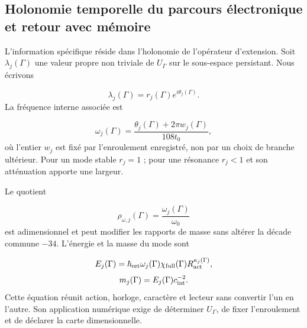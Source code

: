 \subsection{Holonomie temporelle du parcours électronique et retour avec mémoire}
L’information spécifique réside dans l’holonomie de l’opérateur d’extension. Soit \(\lambda_j(\Gamma)\) une valeur propre non triviale de \(U_\Gamma\) sur le sous-espace persistant. Nous écrivons

\[
 \lambda_j(\Gamma)=r_j(\Gamma)e^{i\theta_j(\Gamma)}.
\]
La fréquence interne associée est

\[
 \omega_j(\Gamma)
 =\frac{\theta_j(\Gamma)+2\pi w_j(\Gamma)}{108t_0},
\]
où l’entier \(w_j\) est fixé par l’enroulement enregistré, non par un choix de branche ultérieur. Pour un mode stable \(r_j=1\) ; pour une résonance \(r_j<1\) et son atténuation apporte une largeur.

Le quotient

\[
 \rho_{\omega,j}(\Gamma)
 =\frac{\omega_j(\Gamma)}{\omega_0}
\]
est adimensionnel et peut modifier les rapports de masse sans altérer la décade commune \(-34\). L’énergie et la masse du mode sont

\[
 E_j(\Gamma)=\hbar_{\rm ret}\omega_j(\Gamma)
 \chi_{\rm full}(\Gamma)R_{\rm act}^{\kappa_j(\Gamma)},
\]
\[
 m_j(\Gamma)=E_j(\Gamma)c_{\rm int}^{-2}.
\]
Cette équation réunit action, horloge, caractère et lecteur sans convertir l'un en l'autre. Son application numérique exige de déterminer \(U_\Gamma\), de fixer l'enroulement et de déclarer la carte dimensionnelle.


